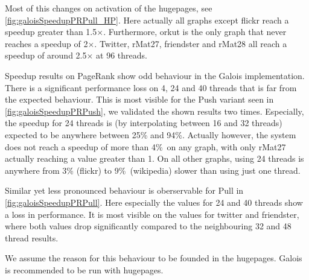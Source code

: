 Most of this changes on activation of the hugepages, see \autoref{fig:galoisSpeedupPRPull_HP}. Here actually all graphs except flickr reach a speedup greater than 1.5$\times$. Furthermore, orkut is the only graph that never reaches a speedup of 2$\times$. Twitter, rMat27, friendster and rMat28 all reach a speedup of around 2.5$\times$ at 96 threads.




Speedup results on PageRank show odd behaviour in the Galois implementation.
There is a significant performance loss on 4, 24 and 40 threads that is far from the expected behaviour. This is most visible for the Push variant seen in \autoref{fig:galoisSpeedupPRPush}, we validated the shown results two times.
Especially, the speedup for 24 threads is (by interpolating between 16 and 32 threads) expected to be anywhere between 25\% and 94\%.
Actually however, the system does not reach a speedup of more than 4\%\ on any graph, with only rMat27 actually reaching a value greater than 1.
On all other graphs, using 24 threads is anywhere from 3\% (flickr) to 9\%\ (wikipedia) slower than using just one thread.

Similar yet less pronounced behaviour is oberservable for Pull in \autoref{fig:galoisSpeedupPRPull}.
Here especially the values for 24 and 40 threads show a loss in performance.
It is most visible on the values for twitter and friendster, where both values drop significantly compared to the neighbouring 32 and 48 thread results.

We assume the reason for this behaviour to be founded in the hugepages. Galois is recommended to be run with hugepages. 

